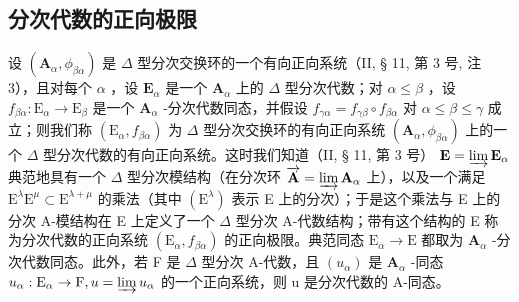 \subsection{分次代数的正向极限}

设 \((\mathbf{A}_{\alpha},\phi_{\beta \alpha})\) 是 \(\Delta\) 型分次交换环的一个有向正向系统（II, § 11, 第 3 号, 注 3），且对每个 \(\alpha\) ，设 \(\mathbf{E}_{\alpha}\) 是一个 \(\mathbf{A}_{\alpha}\) 上的 \(\Delta\) 型分次代数；对 \(\alpha \leqslant \beta\) ，设 \(f_{\beta \alpha}:\mathrm{E}_{\alpha}\to \mathrm{E}_{\beta}\) 是一个 \(\mathbf{A}_{\alpha}\) -分次代数同态，并假设 \(f_{\gamma \alpha} = f_{\gamma \beta}\circ f_{\beta \alpha}\) 对 \(\alpha \leqslant \beta \leqslant \gamma\) 成立；则我们称 \((\mathrm{E}_{\alpha},f_{\beta \alpha})\) 为 \(\Delta\) 型分次交换环的有向正向系统 \((\mathbf{A}_{\alpha},\phi_{\beta \alpha})\) 上的一个 \(\Delta\) 型分次代数的有向正向系统。这时我们知道（II, § 11, 第 3 号） \(\mathbf{E} = \varinjlim \mathbf{E}_{\alpha}\) 典范地具有一个 \(\Delta\) 型分次模结构（在分次环 \(\overrightarrow{\mathbf{A}} = \varinjlim \mathbf{A}_{\alpha}\) 上），以及一个满足 \(\mathrm{E}^{\lambda}\mathrm{E}^{\mu}\subset \mathrm{E}^{\lambda +\mu}\) 的乘法（其中 \((\mathrm{E}^{\lambda})\) 表示 E 上的分次）；于是这个乘法与 E 上的分次 A-模结构在 E 上定义了一个 \(\Delta\) 型分次 A-代数结构；带有这个结构的 E 称为分次代数的正向系统 \((\mathrm{E}_{\alpha},f_{\beta \alpha})\) 的正向极限。典范同态 \(\mathrm{E}_{\alpha}\rightarrow \mathrm{E}\) 都取为 \(\mathbf{A}_{\alpha}\) -分次代数同态。此外，若 F 是 \(\Delta\) 型分次 A-代数，且 \((u_{\alpha})\) 是 \(\mathbf{A}_{\alpha}\) -同态 \(u_{\alpha}:\mathrm{E}_{\alpha}\rightarrow \mathrm{F}, u = \varinjlim u_{\alpha}\) 的一个正向系统，则 u 是分次代数的 A-同态。

